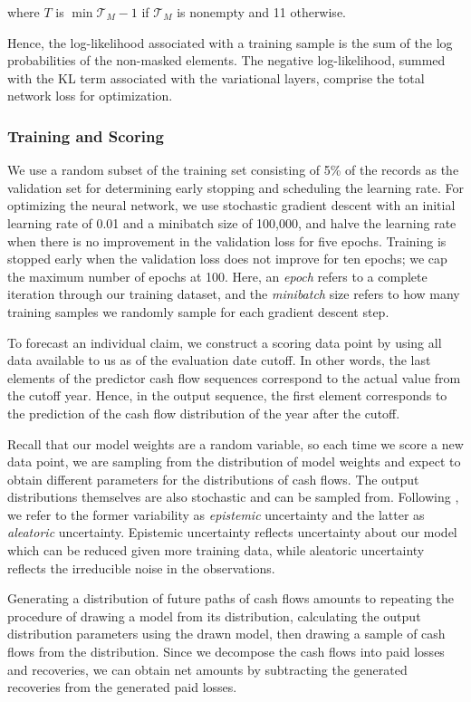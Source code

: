 \documentclass{article}
\begin{document}
where $T$ is $\min \mathcal{T}_M - 1$ if $\mathcal{T}_M$ is nonempty and 11 otherwise.

Hence, the log-likelihood associated with a training sample is the sum of the log probabilities of the non-masked elements. The negative log-likelihood, summed with the KL term associated with the variational layers, comprise the total network loss for optimization.

\subsubsection{Training and Scoring}

We use a random subset of the training set consisting of 5\% of the records as the validation set for determining early stopping and scheduling the learning rate. For optimizing the neural network, we use stochastic gradient descent with an initial learning rate of 0.01 and a minibatch size of 100,000, and halve the learning rate when there is no improvement in the validation loss for five epochs. Training is stopped early when the validation loss does not improve for ten epochs; we cap the maximum number of epochs at 100. Here, an \textit{epoch} refers to a complete iteration through our training dataset, and the \textit{minibatch} size refers to how many training samples we randomly sample for each gradient descent step.

To forecast an individual claim, we construct a scoring data point by using all data available to us as of the evaluation date cutoff. In other words, the last elements of the predictor cash flow sequences correspond to the actual value from the cutoff year. Hence, in the output sequence, the first element corresponds to the prediction of the cash flow distribution of the year after the cutoff.

Recall that our model weights are a random variable, so each time we score a new data point, we are sampling from the distribution of model weights and expect to obtain different parameters for the distributions of cash flows. The output distributions themselves are also stochastic and can be sampled from. Following \cite{NIPS2017_7141}, we refer to the former variability as \textit{epistemic} uncertainty and the latter as \textit{aleatoric} uncertainty. Epistemic uncertainty reflects uncertainty about our model which can be reduced given more training data, while aleatoric uncertainty reflects the irreducible noise in the observations.

Generating a distribution of future paths of cash flows amounts to repeating the procedure of drawing a model from its distribution, calculating the output distribution parameters using the drawn model, then drawing a sample of cash flows from the distribution. Since we decompose the cash flows into paid losses and recoveries, we can obtain net amounts by subtracting the generated recoveries from the generated paid losses.
\end{document}
